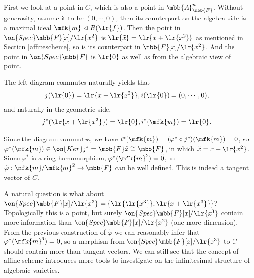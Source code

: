\documentclass[12pt]{article}
\begin{document}
First we look at a point in $C$, which is also a point in $\mbb{A}_{\mbb{F}}^n$. Without generosity, assume it to be $(0,\cdots,0)$, then its counterpart on the algebra side is a maximal ideal $\mfk{m}\vartriangleleft R(\lr{f})$. Then the point in $\on{Spec}\mbb{F}[x]/\lr{x^2}$ is $\lr{\tilde{x}}=\lr{x+\lr{x^2}}$ as mentioned in Section \ref{affinescheme}, so is its counterpart in $\mbb{F}[x]/\lr{x^2}$. And the point in $\on{Spec}\mbb{F}$ is $\lr{0}$ as well as from the algebraic view of point.

The left diagram commutes naturally yields that
$$
j(\lr{0})=\lr{x+\lr{x^2}}, i(\lr{0})=(0,\cdots,0),
$$
and naturally in the geometric side,
$$
j^*(\lr{x+\lr{x^2}})=\lr{0}, i^*(\mfk{m})=\lr{0}.
$$

Since the diagram commutes, we have $i^*(\mfk{m})=(\varphi^*\circ j^*)(\mfk{m})=0$, so $\varphi^*(\mfk{m})\in\on{Ker}j^*=\mbb{F}\tilde{x}\cong\mbb{F}$, in which $\tilde{x}=x+\lr{x^2}$. Since $\varphi^*$ is a ring homomorphism, $\varphi^*(\mfk{m}^2)=\tilde{0}$, so $\tilde{\varphi}:\mfk{m}/\mfk{m}^2\rightarrow\mbb{F}$ can be well defined. This is indeed a tangent vector of $C$.

A natural question is what about $\on{Spec}\mbb{F}[x]/\lr{x^3}=\{\lr{\lr{x^3}},\lr{x+\lr{x^3}}\}$? Topologically this is a point, but surely $\on{Spec}\mbb{F}[x]/\lr{x^3}$ contain more information than $\on{Spec}\mbb{F}[x]/\lr{x^2}$ (one more dimension). From the previous construction of $\tilde{\varphi}$ we can reasonably infer that $\varphi^*(\mfk{m}^3)=0$, so a morphism from $\on{Spec}\mbb{F}[x]/\lr{x^3}$ to $C$ should contain more than tangent vectors. We can still see that the concept of affine scheme introduces more tools to investigate on the infinitesimal structure of algebraic varieties.

%
%
\end{document}

